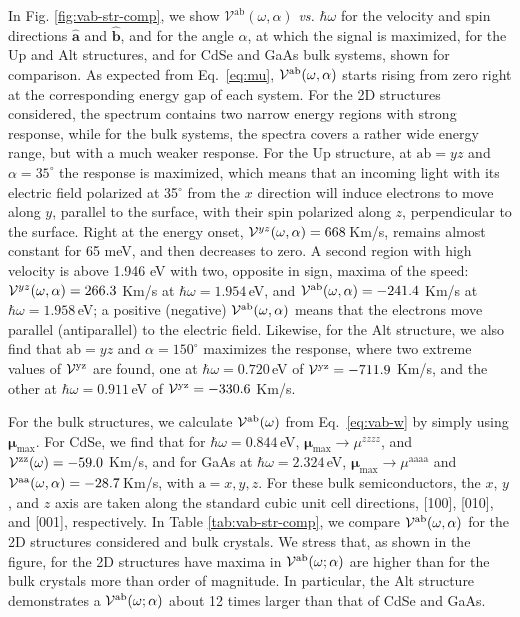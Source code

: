 \documentclass[floatfix,prb,aps,superscriptaddress,showpacs,11pt,preprint,letterpaper]{revtex4}
\begin{document}
In Fig. \ref{fig:vab-str-comp}, we show $\mathcal{V}^{\mathrm{ab}}
(\omega,\alpha)$ {\it vs.} $\hbar\omega$ for the 
velocity and spin
directions
$\hat{\mathbf{a}}$ and $\hat{\mathbf{b}}$, and for the angle $\alpha$, at which
the signal is maximized, for the Up  and Alt structures, and for CdSe and GaAs
bulk systems, shown for comparison. As expected from
Eq.~\eqref{eq:mu}, 
${\cal V}^{\mathrm{a}\mathrm{b}}(\omega,\alpha)$ starts rising 
from zero right at the
corresponding energy gap of each system. For the 2D structures considered, the
spectrum contains two narrow energy regions with strong response, while for the
bulk systems, the spectra covers a rather wide energy range, but with a much
weaker response. For the Up structure, at $\mathrm{a}\mathrm{b}=yz$ and
$\alpha=35^\circ$ the response is maximized, which means that an incoming light
with its electric field polarized at 35$^\circ$ from the $x$ direction will
induce electrons to move along $y$, parallel to the surface, with their spin
polarized along $z$, perpendicular to the surface. Right at the energy onset, ${\cal
V}^{yz}(\omega,\alpha)=668$\,Km/s, remains almost constant for 65 meV, and then
decreases to zero. A second region with high velocity is above 1.946 eV with
two, opposite in sign, maxima of the speed: ${\cal
V}^{yz}(\omega,\alpha)=266.3$ Km/s at $\hbar\omega=1.954$\,eV, and ${\cal
V}^{\mathrm{a}\mathrm{b}}(\omega,\alpha)=-241.4$ Km/s at
$\hbar\omega=1.958$\,eV; a positive (negative) ${\cal
V}^{\mathrm{a}\mathrm{b}}(\omega,\alpha)$ means that the electrons move
parallel (antiparallel) to the electric field. Likewise, for the Alt structure,
we also find that $\mathrm{a}\mathrm{b}=yz$ and $\alpha=150^\circ$ maximizes
the response, where two extreme values of ${\cal V}^{\mathrm{y}\mathrm{z}}$ are
found, one at  $\hbar\omega=0.720$\,eV of ${\cal
V}^{\mathrm{y}\mathrm{z}}=-711.9$ Km/s, and the other at
$\hbar\omega=0.911$\,eV of ${\cal V}^{\mathrm{y}\mathrm{z}}=-330.6$ Km/s.
 
For the bulk structures, we calculate ${\cal V}^{\mathrm{a}\mathrm{b}}(\omega)$
from Eq.~\eqref{eq:vab-w} by simply using $\boldsymbol{\mu}_{\mathrm{max}}$.
For CdSe, we find that for $\hbar\omega=0.844$\,eV,
$\boldsymbol{\mu}_{\mathrm{max}}\to \mu^{zzzz}$, and ${\cal
V}^{\mathrm{z}\mathrm{z}}(\omega)=-59.0$ Km/s, and for GaAs at
$\hbar\omega=2.324$\,eV,
$\boldsymbol{\mu}_{\mathrm{max}}\to\mu^{\mathrm{aaaa}}$ and ${\cal
V}^{\mathrm{a}\mathrm{a}}(\omega,\alpha)=-28.7$\,Km/s, with $\mathrm{a}=x,y,z$.
For these bulk semiconductors, the $x$, $y$, and $z$ axis are taken along the
standard cubic unit cell directions, [100], [010], and [001], respectively. In
Table \ref{tab:vab-str-comp}, we compare ${\cal
V}^{\mathrm{a}\mathrm{b}}(\omega,\alpha)$ for the 2D structures considered and
bulk crystals. We stress that, as shown in the figure, for the 2D structures
have maxima in ${\cal V}^{\mathrm{a}\mathrm{b}}(\omega;\alpha)$ are higher than
for the bulk crystals more than order of magnitude. In particular, the Alt structure demonstrates a ${\cal
V}^{\mathrm{a}\mathrm{b}}(\omega;\alpha)$ about 12 times larger than that
of CdSe and GaAs.
\end{document}
